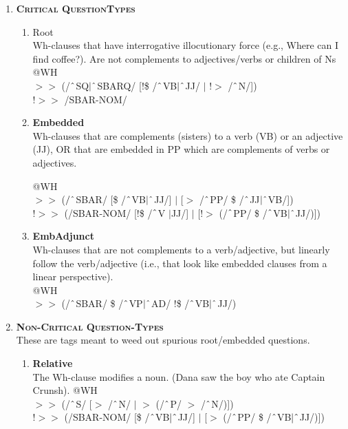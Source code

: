 \begin{enumerate}
    \item[] \textbf{\textsc{Critical QuestionTypes}}
        \begin{enumerate}
            \item Root\\
            Wh-clauses that have interrogative illocutionary force (e.g., \textsf{Where can I find coffee?}). Are not complements to adjectives/verbs or children of Ns\\
            @WH \\
            $>\!\!>$ (/$\string^$SQ$|\string^$SBARQ/ [!\$ /$\string^$VB$|\string^$JJ/ $|$ !$>$ /$\string^$N/]) \\
            !$>\!\!>$ /SBAR-NOM/

            \item \textbf{Embedded}\\ 
            Wh-clauses that are complements (sisters) to a verb (VB) or an adjective (JJ), OR that are embedded in PP which are complements of verbs or adjectives.

            @WH \\
            $>\!\!>$ ($/\string^$SBAR/ [\$ /$\string^$VB$|\string^$JJ/] $|$ [$>$ /$\string^$PP/ \$ /$\string^$JJ$|\string^$VB/]) \\
            !$>\!\!>$ (/SBAR-NOM/ [!\$ /$\string^$V $|$JJ/] $|$ [!$>$ (/$\string^$PP/ \$ /$\string^$VB$|\string^$JJ/)])

            \item \textbf{EmbAdjunct}\\
            Wh-clauses that are not complements to a verb/adjective, but linearly follow the verb/adjective (i.e., that look like embedded clauses from a linear perspective).\\
            @WH\\ 
            $>\!\!>$ (/$\string^$SBAR/ \$ /$\string^$VP$|\string^$AD/ !\$ /$\string^$VB$|\string^$JJ/)
            
            \end{enumerate}
        \item[] \textbf{\textsc{Non-Critical Question-Types}}\\
        These are tags meant to weed out spurious root/embedded questions.

        \begin{enumerate}
            \item \textbf{Relative}\\
            The Wh-clause modifies a noun. (\textsf{Dana saw the boy who ate Captain Crunsh}).
            @WH \\
            $>\!\!>$ (/$\string^$S/ [$>$ /$\string^$N/ $|$ $>$ (/$\string^$P/ $>$ /$\string^$N/)]) \\
            !$>\!\!>$ (/SBAR-NOM/ [\$ /$\string^$VB$|\string^$JJ/] $|$ [$>$ (/$\string^$PP/ \$ /$\string^$VB$|\string^$JJ/)])


\end{enumerate}
\end{enumerate}
